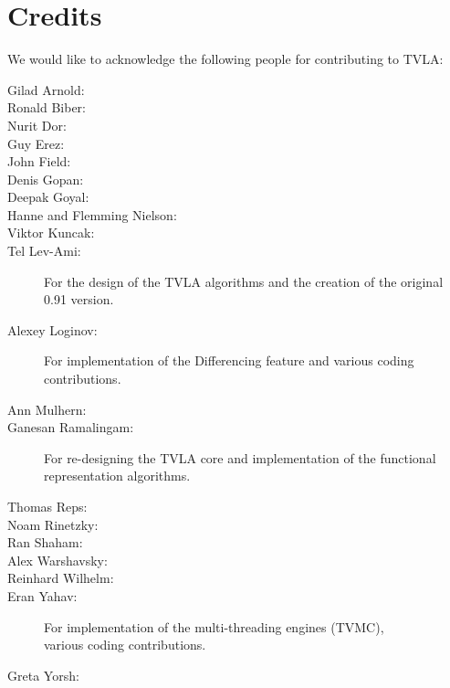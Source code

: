 \section{Credits}

We would like to acknowledge the following people for contributing
to TVLA:
\begin{description}
    \item[Gilad Arnold:]
    \item [Ronald Biber:]
    \item[Nurit Dor:]
    \item [Guy Erez:]
    \item[John Field:]
    \item [Denis Gopan:]
    \item[Deepak Goyal:]
    \item [Hanne and Flemming Nielson:] 
    \item [Viktor Kuncak:]
    \item[Tel Lev-Ami:] For the design of the TVLA algorithms and the creation of the original 0.91 version.
    \item[Alexey Loginov:]
    For implementation of the Differencing feature and various coding
    contributions.
    \item [Ann Mulhern:]
    \item[Ganesan Ramalingam:]
    For re-designing the TVLA core and implementation of the
    functional representation algorithms.
    \item[Thomas Reps:]
    \item[Noam Rinetzky:]
    \item[Ran Shaham:]
    \item [Alex Warshavsky:]
    \item[Reinhard Wilhelm:]
    \item[Eran Yahav:]
    For implementation of the multi-threading engines (TVMC),\\
    various coding contributions.
    \item[Greta Yorsh:]
\end{description}
